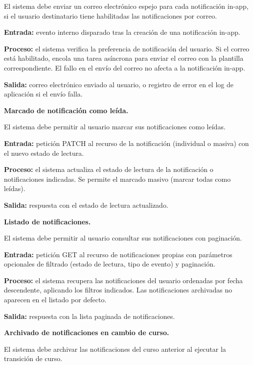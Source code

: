 \begin{functional}
\begin{functional}
    El sistema debe enviar un correo electrónico espejo para cada notificación in-app, si el usuario destinatario tiene habilitadas las notificaciones por correo.

    \textbf{Entrada:} evento interno disparado tras la creación de una notificación in-app.

    \textbf{Proceso:} el sistema verifica la preferencia de notificación del usuario. Si el correo está habilitado, encola una tarea asíncrona para enviar el correo con la plantilla correspondiente. El fallo en el envío del correo no afecta a la notificación in-app.

    \textbf{Salida:} correo electrónico enviado al usuario, o registro de error en el log de aplicación si el envío falla.

    \item \textbf{Marcado de notificación como leída.}

    El sistema debe permitir al usuario marcar sus notificaciones como leídas.

    \textbf{Entrada:} petición PATCH al recurso de la notificación (individual o masiva) con el nuevo estado de lectura.

    \textbf{Proceso:} el sistema actualiza el estado de lectura de la notificación o notificaciones indicadas. Se permite el marcado masivo (marcar todas como leídas).

    \textbf{Salida:} respuesta con el estado de lectura actualizado.

    \item \textbf{Listado de notificaciones.}

    El sistema debe permitir al usuario consultar sus notificaciones con paginación.

    \textbf{Entrada:} petición GET al recurso de notificaciones propias con parámetros opcionales de filtrado (estado de lectura, tipo de evento) y paginación.

    \textbf{Proceso:} el sistema recupera las notificaciones del usuario ordenadas por fecha descendente, aplicando los filtros indicados. Las notificaciones archivadas no aparecen en el listado por defecto.

    \textbf{Salida:} respuesta con la lista paginada de notificaciones.

    \item \textbf{Archivado de notificaciones en cambio de curso.}

    El sistema debe archivar las notificaciones del curso anterior al ejecutar la transición de curso.


\end{functional}
\end{functional}
